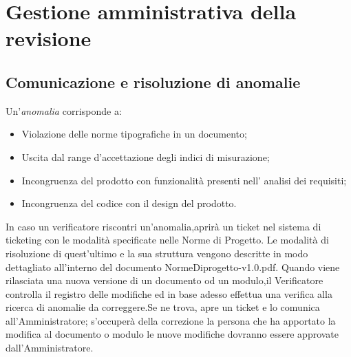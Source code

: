 \section{Gestione amministrativa della revisione}


\subsection{Comunicazione e risoluzione di anomalie}

Un'\textit{anomalia} corrisponde a:
\begin{itemize}

\item Violazione delle norme tipografiche in un documento;
\item Uscita dal range d'accettazione degli indici di misurazione;
\item Incongruenza del prodotto con funzionalità presenti nell' analisi dei requisiti;
\item Incongruenza del codice con il design del prodotto.

\end{itemize}

In caso un verificatore riscontri un'anomalia,aprirà un ticket nel sistema di ticketing con le modalità specificate nelle Norme di Progetto.
Le modalità di risoluzione di quest'ultimo e la sua struttura vengono descritte in modo dettagliato all'interno del documento NormeDiprogetto-v1.0.pdf.
Quando viene rilasciata una nuova versione di un documento od un modulo,il Verificatore controlla il registro delle modifiche ed in base adesso effettua una verifica alla ricerca di anomalie da correggere.Se ne trova, apre un ticket e lo comunica all'Amministratore; s'occuperà della correzione la persona che ha apportato la modifica al documento o modulo le nuove modifiche dovranno essere approvate dall'Amministratore.